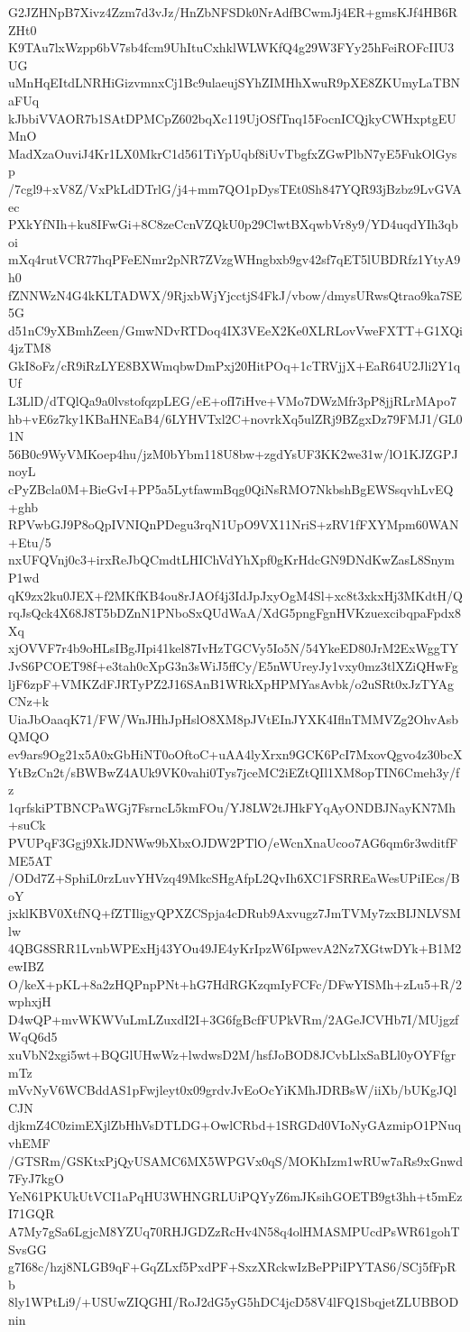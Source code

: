 G2JZHNpB7Xivz4Zzm7d3vJz/HnZbNFSDk0NrAdfBCwmJj4ER+gmsKJf4HB6RZHt0
K9TAu7lxWzpp6bV7sb4fcm9UhItuCxhklWLWKfQ4g29W3FYy25hFeiROFcIIU3UG
uMnHqEItdLNRHiGizvmnxCj1Bc9ulaeujSYhZIMHhXwuR9pXE8ZKUmyLaTBNaFUq
kJbbiVVAOR7b1SAtDPMCpZ602bqXc119UjOSfTnq15FocnICQjkyCWHxptgEUMnO
MadXzaOuviJ4Kr1LX0MkrC1d561TiYpUqbf8iUvTbgfxZGwPlbN7yE5FukOlGysp
/7cgl9+xV8Z/VxPkLdDTrlG/j4+mm7QO1pDysTEt0Sh847YQR93jBzbz9LvGVAec
PXkYfNIh+ku8IFwGi+8C8zeCcnVZQkU0p29ClwtBXqwbVr8y9/YD4uqdYIh3qboi
mXq4rutVCR77hqPFeENmr2pNR7ZVzgWHngbxb9gv42sf7qET5lUBDRfz1YtyA9h0
fZNNWzN4G4kKLTADWX/9RjxbWjYjcctjS4FkJ/vbow/dmysURwsQtrao9ka7SE5G
d51nC9yXBmhZeen/GmwNDvRTDoq4IX3VEeX2Ke0XLRLovVweFXTT+G1XQi4jzTM8
GkI8oFz/cR9iRzLYE8BXWmqbwDmPxj20HitPOq+1cTRVjjX+EaR64U2Jli2Y1qUf
L3LlD/dTQlQa9a0lvstofqzpLEG/eE+ofI7iHve+VMo7DWzMfr3pP8jjRLrMApo7
hb+vE6z7ky1KBaHNEaB4/6LYHVTxl2C+novrkXq5ulZRj9BZgxDz79FMJ1/GL01N
56B0c9WyVMKoep4hu/jzM0bYbm118U8bw+zgdYsUF3KK2we31w/lO1KJZGPJnoyL
cPyZBcla0M+BieGvI+PP5a5LytfawmBqg0QiNsRMO7NkbshBgEWSsqvhLvEQ+ghb
RPVwbGJ9P8oQpIVNIQnPDegu3rqN1UpO9VX11NriS+zRV1fFXYMpm60WAN+Etu/5
nxUFQVnj0c3+irxReJbQCmdtLHIChVdYhXpf0gKrHdcGN9DNdKwZasL8SnymP1wd
qK9zx2ku0JEX+f2MKfKB4ou8rJAOf4j3IdJpJxyOgM4Sl+xc8t3xkxHj3MKdtH/Q
rqJsQck4X68J8T5bDZnN1PNboSxQUdWaA/XdG5pngFgnHVKzuexcibqpaFpdx8Xq
xjOVVF7r4b9oHLsIBgJIpi41kel87IvHzTGCVy5Io5N/54YkeED80JrM2ExWggTY
JvS6PCOET98f+e3tah0cXpG3n3sWiJ5ffCy/E5nWUreyJy1vxy0mz3tlXZiQHwFg
ljF6zpF+VMKZdFJRTyPZ2J16SAnB1WRkXpHPMYasAvbk/o2uSRt0xJzTYAgCNz+k
UiaJbOaaqK71/FW/WnJHhJpHslO8XM8pJVtEInJYXK4IflnTMMVZg2OhvAsbQMQO
ev9ars9Og21x5A0xGbHiNT0oOftoC+uAA4lyXrxn9GCK6PcI7MxovQgvo4z30bcX
YtBzCn2t/sBWBwZ4AUk9VK0vahi0Tys7jceMC2iEZtQIl1XM8opTIN6Cmeh3y/fz
1qrfskiPTBNCPaWGj7FsrncL5kmFOu/YJ8LW2tJHkFYqAyONDBJNayKN7Mh+suCk
PVUPqF3Ggj9XkJDNWw9bXbxOJDW2PTlO/eWcnXnaUcoo7AG6qm6r3wditfFME5AT
/ODd7Z+SphiL0rzLuvYHVzq49MkcSHgAfpL2QvIh6XC1FSRREaWesUPiIEcs/BoY
jxklKBV0XtfNQ+fZTIligyQPXZCSpja4cDRub9Axvugz7JmTVMy7zxBIJNLVSMlw
4QBG8SRR1LvnbWPExHj43YOu49JE4yKrIpzW6IpwevA2Nz7XGtwDYk+B1M2ewIBZ
O/keX+pKL+8a2zHQPnpPNt+hG7HdRGKzqmIyFCFc/DFwYISMh+zLu5+R/2wphxjH
D4wQP+mvWKWVuLmLZuxdI2I+3G6fgBcfFUPkVRm/2AGeJCVHb7I/MUjgzfWqQ6d5
xuVbN2xgi5wt+BQGlUHwWz+lwdwsD2M/hsfJoBOD8JCvbLlxSaBLl0yOYFfgrmTz
mVvNyV6WCBddAS1pFwjleyt0x09grdvJvEoOcYiKMhJDRBsW/iiXb/bUKgJQlCJN
djkmZ4C0zimEXjlZbHhVsDTLDG+OwlCRbd+1SRGDd0VIoNyGAzmipO1PNuqvhEMF
/GTSRm/GSKtxPjQyUSAMC6MX5WPGVx0qS/MOKhIzm1wRUw7aRs9xGnwd7FyJ7kgO
YeN61PKUkUtVCI1aPqHU3WHNGRLUiPQYyZ6mJKsihGOETB9gt3hh+t5mEzI71GQR
A7My7gSa6LgjcM8YZUq70RHJGDZzRcHv4N58q4olHMASMPUcdPsWR61gohTSvsGG
g7I68c/hzj8NLGB9qF+GqZLxf5PxdPF+SxzXRckwIzBePPiIPYTAS6/SCj5fFpRb
8ly1WPtLi9/+USUwZIQGHI/RoJ2dG5yG5hDC4jcD58V4lFQ1SbqjetZLUBBODnin
